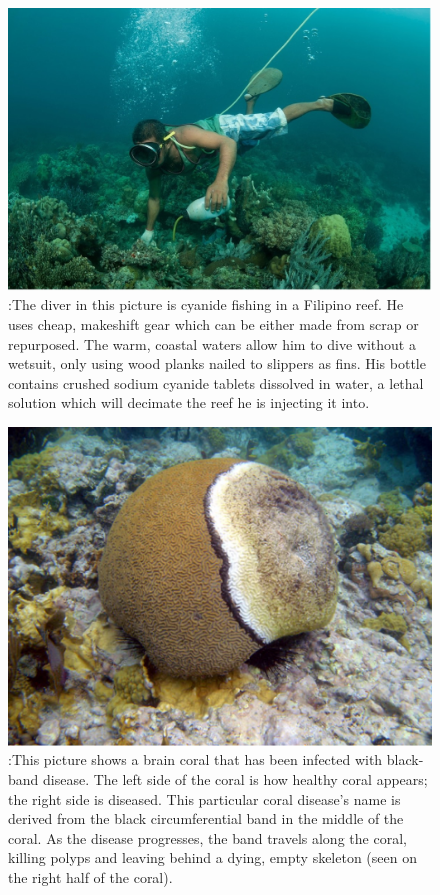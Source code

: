 \documentclass{book}\usepackage{knitr}
\begin{document}
\begin{figure}
\includegraphics[width=\linewidth]{images/cyanidefishing}
\caption{:The diver in this picture is cyanide fishing in a Filipino reef. He uses cheap, makeshift gear which can be either made from scrap or repurposed. The warm, coastal waters allow him to dive without a wetsuit, only using wood planks nailed to slippers as fins. His bottle contains crushed sodium cyanide tablets dissolved in water, a lethal solution which will decimate the reef he is injecting it into.}
\label{fig:Cyanide Fishing}
\end{figure}

\begin{figure}
\includegraphics[width=\linewidth]{images/coraldisease}
\caption{:This picture shows a brain coral that has been infected with black-band disease. The left side of the coral is how healthy coral appears; the right side is diseased. This particular coral disease’s name is derived from the black circumferential band in the middle of the coral. As the disease progresses, the band travels along the coral, killing polyps and leaving behind a dying, empty skeleton (seen on the right half of the coral).}
\label{fig:Black Band Disease}
\end{figure}
\end{document}
